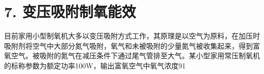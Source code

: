 \section*{7. 变压吸附制氧能效}
⽬前家⽤⼩型制氧机⼤多以变压吸附⽅式⼯作，其原理是以空⽓为原料，在加压时吸附剂将空⽓中⼤部分氮⽓吸附，氧⽓和未被吸附的少量氮⽓被收集起来，得到富氧空⽓。被吸附的氮⽓在减压条件下通过尾⽓管排⾄⼤⽓。某⼩型家⽤常压制氧机的标称参数为额定功率100W，输出富氧空⽓中氧⽓浓度91%
